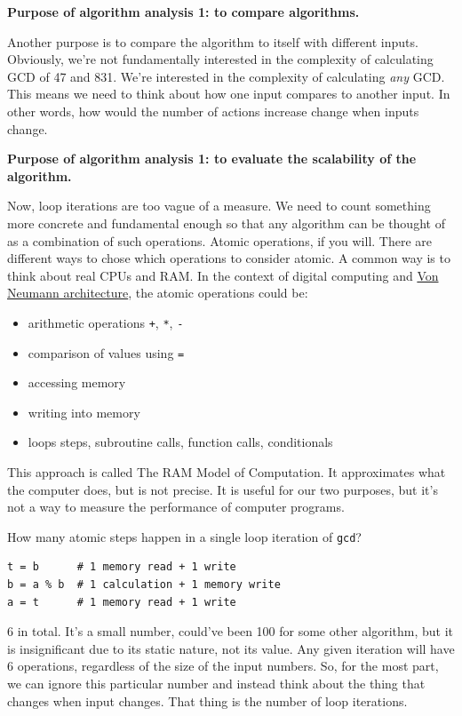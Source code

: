 \documentclass[a4paper, justified, notitlepage, sfsidenotes, notoc]{tufte-book}
\begin{document}
\textbf{Purpose of algorithm analysis 1: to compare algorithms.}

Another purpose is to compare the algorithm to itself with different inputs. Obviously, we're not fundamentally interested in the complexity of calculating GCD of 47 and 831. We're interested in the complexity of calculating \emph{any} GCD. This means we need to think about how one input compares to another input. In other words, how would the number of actions increase change when inputs change.

\textbf{Purpose of algorithm analysis 1: to evaluate the scalability of the algorithm.}

Now, loop iterations are too vague of a measure. We need to count something more concrete and fundamental enough so that any algorithm can be thought of as a combination of such operations. Atomic operations, if you will. There are different ways to chose which operations to consider atomic. A common way is to think about real CPUs and RAM. In the context of digital computing and \href{https://en.wikipedia.org/wiki/Von\_Neumann\_architecture}{Von Neumann architecture}, the atomic operations could be:

\begin{itemize}
\item arithmetic operations \texttt{+}, \texttt{*}, \texttt{-}
\item comparison of values using \texttt{=}
\item accessing memory
\item writing into memory
\item loops steps, subroutine calls, function calls, conditionals
\end{itemize}

This approach is called The RAM Model of Computation. It approximates what the computer does, but is not precise. It is useful for our two purposes, but it's not a way to measure the performance of computer programs.

How many atomic steps happen in a single loop iteration of \texttt{gcd}?

\begin{verbatim}
t = b      # 1 memory read + 1 write
b = a % b  # 1 calculation + 1 memory write
a = t      # 1 memory read + 1 write
\end{verbatim}

6 in total. It's a small number, could've been 100 for some other algorithm, but it is insignificant due to its static nature, not its value. Any given iteration will have 6 operations, regardless of the size of the input numbers. So, for the most part, we can ignore this particular number and instead think about the thing that changes when input changes. That thing is the number of loop iterations.
\end{document}
